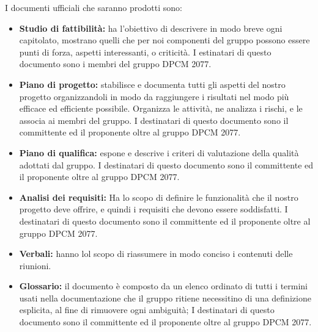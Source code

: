 					I documenti ufficiali che saranno prodotti sono:
					\begin{itemize}
						\item \textbf{Studio di fattibilità:} ha l'obiettivo di descrivere in modo breve ogni capitolato, mostrano quelli che per noi componenti del gruppo possono essere punti di forza, aspetti interessanti, o criticità. I estinatari di questo documento sono i membri del gruppo DPCM 2077.
						\item \textbf{Piano di progetto:} stabilisce e documenta tutti gli aspetti del nostro progetto organizzandoli in modo da raggiungere i risultati nel modo più efficace ed efficiente possibile. Organizza le attività, ne analizza i rischi, e le associa ai membri del gruppo. I destinatari di questo documento sono il committente ed il proponente oltre al gruppo DPCM 2077. 
						\item \textbf{Piano di qualifica:} espone e descrive i criteri di valutazione della qualità adottati dal gruppo. I destinatari di questo documento sono il committente ed il proponente oltre al gruppo DPCM 2077. 
						\item \textbf{Analisi dei requisiti:} Ha lo scopo di definire le funzionalità che il nostro progetto deve offrire, e quindi i requisiti che devono essere soddisfatti. I destinatari di questo documento sono il committente ed il proponente oltre al gruppo DPCM 2077.
						\item \textbf{Verbali:} hanno lol scopo di riassumere in modo conciso i contenuti delle riunioni.
						\item \textbf{Glossario:} il documento è composto da un elenco ordinato di tutti i termini usati nella documentazione che il gruppo ritiene necessitino di una definizione esplicita, al fine di rimuovere ogni ambiguità; I destinatari di questo documento sono il committente ed il proponente oltre al gruppo DPCM 2077.
					\end{itemize}
					
